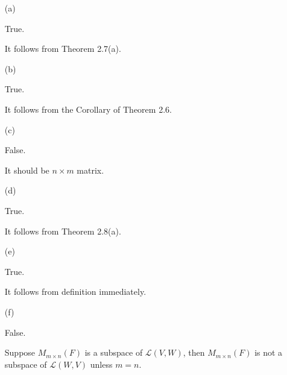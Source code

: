 \begin{Exercise}
\begin{enumerate}[(a)]
\item[(a)]
\begin{answer}
True.
\end{answer}
\begin{solution}
It follows from Theorem 2.7(a).
\end{solution}

\item[(b)]
\begin{answer}
True.
\end{answer}
\begin{solution}
It follows from the Corollary of Theorem 2.6.
\end{solution}

\item[(c)]
\begin{answer}
False.
\end{answer}
\begin{solution}
It should be $n\times m$ matrix.
\end{solution}

\item[(d)]
\begin{answer}
True.
\end{answer}
\begin{solution}
It follows from Theorem 2.8(a).
\end{solution}

\item[(e)]
\begin{answer}
True.
\end{answer}
\begin{solution}
It follows from definition immediately.
\end{solution}

\item[(f)]
\begin{answer}
False.
\end{answer}
\begin{solution}
Suppose $M_{m\times n}(F)$ is a subspace of $\mathcal{L}(V,W)$, then $M_{m\times n}(F)$ is not a subspace of $\mathcal{L}(W,V)$ unless $m=n$.
\end{solution}

\end{enumerate}
\end{Exercise}